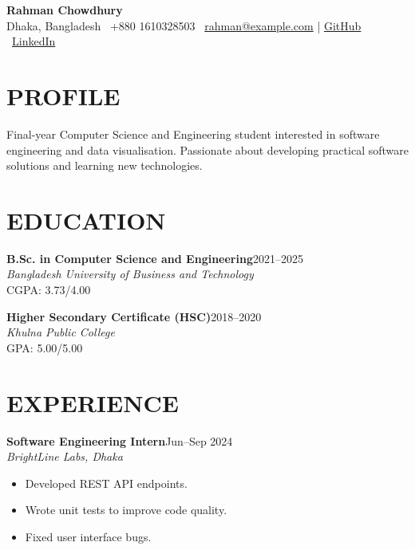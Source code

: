 \documentclass[11pt,a4paper]{article}
\newcommand{\cventry}[4]{
    \noindent
    \textbf{#1}\hfill #2\\
    \textit{#3}\\
    #4
    \vspace{3pt}
}
\begin{document}
\begin{center}
   {\LARGE\bfseries Rahman Chowdhury}\\[4pt]
    Dhaka, Bangladesh \textbar\
    +880 1610328503  \textbar\
    \href{mailto:rahman@example.com}
    {rahman@example.com} |
    \href{https://github.com/arghoghosh88}{GitHub}
    \textbar\ \href{www.linkedin.com/in/argho-ghosh-10b403312}{LinkedIn}
\end{center}

\section*{PROFILE}

Final-year Computer Science and Engineering student interested
in software engineering and data visualisation. Passionate about
developing practical software solutions and learning new technologies.

\section*{EDUCATION}

\cventry
{B.Sc. in Computer Science and Engineering}
{2021--2025}
{Bangladesh University of Business and Technology}
{CGPA: 3.73/4.00}

\cventry
{Higher Secondary Certificate (HSC)}
{2018--2020}
{Khulna Public College}
{GPA: 5.00/5.00}

\section*{EXPERIENCE}

\cventry
{Software Engineering Intern}
{Jun--Sep 2024}
{BrightLine Labs, Dhaka}
{}

\begin{itemize}
    \item Developed REST API endpoints.
    \item Wrote unit tests to improve code quality.
    \item Fixed user interface bugs.
\end{itemize}
\end{document}
